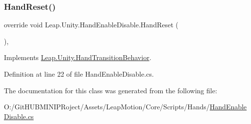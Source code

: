 \subsubsection{\texorpdfstring{HandReset()}{HandReset()}}
{\footnotesize\ttfamily override void Leap.\+Unity.\+Hand\+Enable\+Disable.\+Hand\+Reset (\begin{DoxyParamCaption}{ }\end{DoxyParamCaption})\hspace{0.3cm}{\ttfamily [protected]}, {\ttfamily [virtual]}}



Implements \mbox{\hyperlink{class_leap_1_1_unity_1_1_hand_transition_behavior_ae0a27730cfec3d323289ef7d4ef950d7}{Leap.\+Unity.\+Hand\+Transition\+Behavior}}.



Definition at line 22 of file Hand\+Enable\+Disable.\+cs.



The documentation for this class was generated from the following file\+:\begin{DoxyCompactItemize}
\item 
O\+:/\+Git\+H\+U\+B\+M\+I\+N\+I\+P\+Roject/\+Assets/\+Leap\+Motion/\+Core/\+Scripts/\+Hands/\mbox{\hyperlink{_hand_enable_disable_8cs}{Hand\+Enable\+Disable.\+cs}}\end{DoxyCompactItemize}
